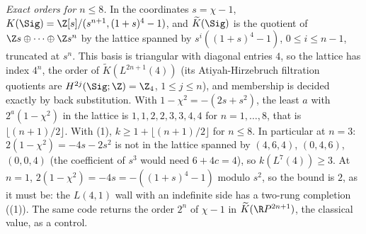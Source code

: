 \emph{Exact orders for $n \leq 8$.} In the coordinates $s = \chi - 1$, $K(\Sig) = \Z[s]/(s^{n+1}, (1+s)^{4} - 1)$, and $\widetilde K(\Sig)$ is the quotient of $\Z s \oplus \dots \oplus \Z s^{n}$ by the lattice spanned by $s^{i}((1+s)^{4} - 1)$, $0 \leq i \leq n - 1$, truncated at $s^{n}$. This basis is triangular with diagonal entries $4$, so the lattice has index $4^{n}$, the order of $\widetilde K(L^{2n+1}(4))$ (its Atiyah-Hirzebruch filtration quotients are $H^{2j}(\Sig; \Z) = \Z_{4}$, $1 \leq j \leq n$), and membership is decided exactly by back substitution. With $1 - \chi^{2} = -(2s + s^{2})$, the least $a$ with $2^{a}(1 - \chi^{2})$ in the lattice is $1, 1, 2, 2, 3, 3, 4, 4$ for $n = 1, \dots, 8$, that is $\lfloor (n+1)/2 \rfloor$. With (1), $k \geq 1 + \lfloor (n+1)/2 \rfloor$ for $n \leq 8$. In particular at $n = 3$: $2(1 - \chi^{2}) = -4s - 2s^{2}$ is not in the lattice spanned by $(4,6,4)$, $(0,4,6)$, $(0,0,4)$ (the coefficient of $s^{3}$ would need $6 + 4c = 4$), so $k(L^{7}(4)) \geq 3$. At $n = 1$, $2(1 - \chi^{2}) = -4s = -((1+s)^{4} - 1)$ modulo $s^{2}$, so the bound is $2$, as it must be: the $L(4,1)$ wall with an indefinite side has a two-rung completion ((1)). The same code returns the order $2^{n}$ of $\chi - 1$ in $\widetilde K(\R P^{2n+1})$, the classical value, as a control.

